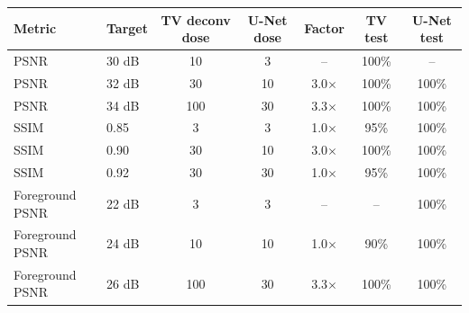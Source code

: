\begin{tabular}{llccccc}
\toprule
Metric & Target & TV deconv dose & U-Net dose & Factor & TV test & U-Net test \\
\midrule
PSNR & 30 dB & 10 & 3 & -- & 100\% & -- \\
PSNR & 32 dB & 30 & 10 & 3.0$\times$ & 100\% & 100\% \\
PSNR & 34 dB & 100 & 30 & 3.3$\times$ & 100\% & 100\% \\
SSIM & 0.85 & 3 & 3 & 1.0$\times$ & 95\% & 100\% \\
SSIM & 0.90 & 30 & 10 & 3.0$\times$ & 100\% & 100\% \\
SSIM & 0.92 & 30 & 30 & 1.0$\times$ & 95\% & 100\% \\
Foreground PSNR & 22 dB & 3 & 3 & -- & -- & 100\% \\
Foreground PSNR & 24 dB & 10 & 10 & 1.0$\times$ & 90\% & 100\% \\
Foreground PSNR & 26 dB & 100 & 30 & 3.3$\times$ & 100\% & 100\% \\
\bottomrule
\end{tabular}
